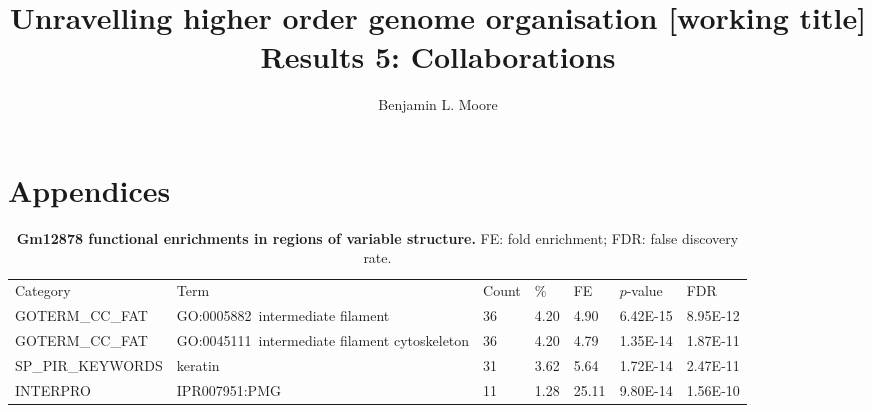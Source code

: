 \documentclass[a4paper,11pt,oneside]{book}
\title{ \vspace{3in} Unravelling higher order genome organisation {\small [working
    title]} \\ \vspace{2em} {\large {\bf Results 5: Collaborations}} }
\author{Benjamin L. Moore}
\begin{document}
\chapter{Appendices}

\setcounter{table}{0}
\makeatletter 
\renewcommand{\thetable}{A\@arabic\c@table}
\makeatother


{\tiny 
\begin{longtable}{lllllll}
\caption[Gm12878 functional enrichments in regions of variable structure.]{
{\bf 
Gm12878 functional enrichments in regions of variable structure.
} FE: fold enrichment; FDR: false discovery rate.
}\label{tab:gmgo}\\
\endfirsthead
Category          & Term                                          &
Count & \%   & FE & $p$-value   & FDR      \\
GOTERM\_CC\_FAT   & GO:0005882~intermediate filament              & 36    & 4.20 & 4.90            & 6.42E-15 & 8.95E-12 \\
GOTERM\_CC\_FAT   & GO:0045111~intermediate filament cytoskeleton & 36    & 4.20 & 4.79            & 1.35E-14 & 1.87E-11 \\
SP\_PIR\_KEYWORDS & keratin                                       & 31    & 3.62 & 5.64            & 1.72E-14 & 2.47E-11 \\
INTERPRO          & IPR007951:PMG                                 & 11    & 1.28 & 25.11           & 9.80E-14 & 1.56E-10
\end{longtable}
}

\clearpage
\end{document}
